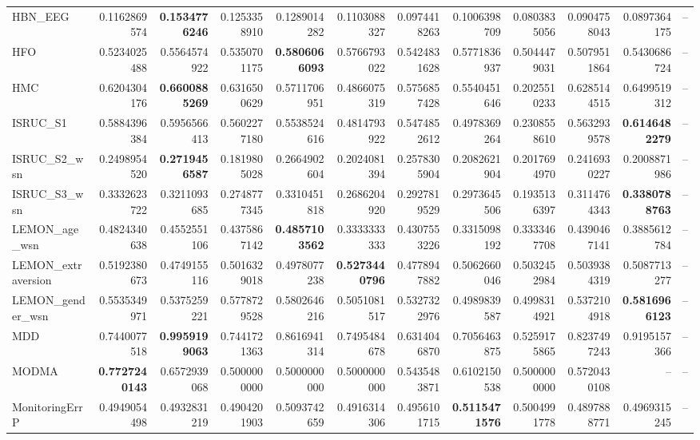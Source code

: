 \begin{table}[htbp]
\begin{tabular}{lrrrrrrrrrrr}
HBN_EEG & 0.1162869574 & \bfseries 0.1534776246 & 0.1253358910 & 0.1289014282 & 0.1103088327 & 0.0974418263 & 0.1006398709 & 0.0803835056 & 0.0904758043 & 0.0897364175 & -- \\
HFO & 0.5234025488 & 0.5564574922 & 0.5350701175 & \bfseries 0.5806066093 & 0.5766793022 & 0.5424831628 & 0.5771836937 & 0.5044479031 & 0.5079511864 & 0.5430686724 & -- \\
HMC & 0.6204304176 & \bfseries 0.6600885269 & 0.6316500629 & 0.5711706951 & 0.4866075319 & 0.5756857428 & 0.5540451646 & 0.2025510233 & 0.6285144515 & 0.6499519312 & -- \\
ISRUC_S1 & 0.5884396384 & 0.5956566413 & 0.5602277180 & 0.5538524616 & 0.4814793922 & 0.5474852612 & 0.4978369264 & 0.2308558610 & 0.5632939578 & \bfseries 0.6146482279 & -- \\
ISRUC_S2_wsn & 0.2498954520 & \bfseries 0.2719456587 & 0.1819805028 & 0.2664902604 & 0.2024081394 & 0.2578305904 & 0.2082621904 & 0.2017694970 & 0.2416930227 & 0.2008871986 & -- \\
ISRUC_S3_wsn & 0.3332623722 & 0.3211093685 & 0.2748777345 & 0.3310451818 & 0.2686204920 & 0.2927819529 & 0.2973645506 & 0.1935136397 & 0.3114764343 & \bfseries 0.3380788763 & -- \\
LEMON_age_wsn & 0.4824340638 & 0.4552551106 & 0.4375867142 & \bfseries 0.4857103562 & 0.3333333333 & 0.4307553226 & 0.3315098192 & 0.3333467708 & 0.4390467141 & 0.3885612784 & -- \\
LEMON_extraversion & 0.5192380673 & 0.4749155116 & 0.5016329018 & 0.4978077238 & \bfseries 0.5273440796 & 0.4778947882 & 0.5062660046 & 0.5032452984 & 0.5039384319 & 0.5087713277 & -- \\
LEMON_gender_wsn & 0.5535349971 & 0.5375259221 & 0.5778729528 & 0.5802646216 & 0.5051081517 & 0.5327322976 & 0.4989839587 & 0.4998314921 & 0.5372104918 & \bfseries 0.5816966123 & -- \\
MDD & 0.7440077518 & \bfseries 0.9959199063 & 0.7441721363 & 0.8616941314 & 0.7495484678 & 0.6314046870 & 0.7056463875 & 0.5259175865 & 0.8237497243 & 0.9195157366 & -- \\
MODMA & \bfseries 0.7727240143 & 0.6572939068 & 0.5000000000 & 0.5000000000 & 0.5000000000 & 0.5435483871 & 0.6102150538 & 0.5000000000 & 0.5720430108 & -- & -- \\
MonitoringErrP & 0.4949054498 & 0.4932831219 & 0.4904201903 & 0.5093742659 & 0.4916314306 & 0.4956101715 & \bfseries 0.5115471576 & 0.5004991778 & 0.4897888771 & 0.4969315245 & -- \\

\end{tabular}
\end{table}
